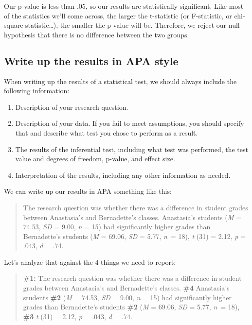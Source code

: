 \documentclass[
]{book}
\providecommand{\tightlist}{%
  \setlength{\itemsep}{0pt}\setlength{\parskip}{0pt}}
\begin{document}
Our p-value is less than .05, so our results are statistically significant. Like most of the statistics we'll come across, the larger the t-statistic (or F-statistic, or chi-square statistic\ldots), the smaller the p-value will be. Therefore, we reject our null hypothesis that there is no difference between the two groups.

\hypertarget{write-up-the-results-in-apa-style}{%
\subsection{Write up the results in APA style}\label{write-up-the-results-in-apa-style}}

When writing up the results of a statistical test, we should always include the following information:

\begin{enumerate}
\def\labelenumi{\arabic{enumi}.}
\tightlist
\item
  Description of your research question.
\item
  Description of your data. If you fail to meet assumptions, you should specify that and describe what test you chose to perform as a result.
\item
  The results of the inferential test, including what test was performed, the test value and degrees of freedom, p-value, and effect size.
\item
  Interpretation of the results, including any other information as needed.
\end{enumerate}

We can write up our results in APA something like this:

\begin{quote}
The research question was whether there was a difference in student grades between Anastasia's and Bernadette's classes. Anastasia's students (\emph{M} = 74.53, \emph{SD} = 9.00, \emph{n} = 15) had significantly higher grades than Bernadette's students (\emph{M} = 69.06, \emph{SD} = 5.77, \emph{n}~= 18), \emph{t} (31) = 2.12, \emph{p} = .043, \emph{d} = .74.
\end{quote}

Let's analyze that against the 4 things we need to report:

\begin{quote}
\textbf{\#1:} The research question was whether there was a difference in student grades between Anastasia's and Bernadette's classes. \textbf{\#4} Anastasia's students \textbf{\#2} (\emph{M} = 74.53, \emph{SD} = 9.00, \emph{n} = 15) had significantly higher grades than Bernadette's students \textbf{\#2} (\emph{M} = 69.06, \emph{SD} = 5.77, \emph{n}~= 18), \textbf{\#3} \emph{t} (31) = 2.12, \emph{p} = .043, \emph{d} = .74.
\end{quote}
\end{document}
